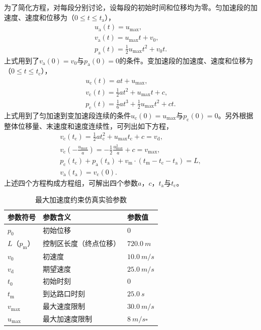 为了简化方程，对每段分别讨论，设每段的初始时间和位移均为零。匀加速段的加速度、速度和位移为（$0\leq t\leq t_\mathrm{a}$），
\begin{gather}
u_\mathrm{a}(t)=u_{\max},\label{eq:amax:ea1}\\
v_\mathrm{a}(t)=u_{\max}t+v_0,\\
p_\mathrm{a}(t)=\frac12u_{\max}t^2+v_0t.\label{eq:amax:ea3}
\end{gather}
上式用到了$v_\mathrm{a}(0)=v_0$与$p_\mathrm{a}(0)=0$的条件。变加速段的加速度、速度和位移为（$0\leq t\leq t_\mathrm{c}$），
\begin{gather}
u_\mathrm{c}(t)=at+u_{\max},\label{eq:amax:ca1}\\
v_\mathrm{c}(t)=\frac12at^2+u_{\max}t+c,\\
p_\mathrm{c}(t)=\frac16at^3+\frac12u_{\max}t^2+ct.\label{eq:amax:ca3}
\end{gather}
上式用到了匀加速到变加速段连续的条件$u_\mathrm{c}(0)=u_{\max}$与$p_\mathrm{c}(0)=0$。另外根据整体位移量、末速度和速度连续性，可列出如下方程，
\begin{gather}
v_\mathrm{c}(t_\mathrm{c})=\frac12at_\mathrm{c}^2+u_{\max}t_\mathrm{c}+c=v_\mathrm{d},\label{eq:amax:1}\\
v_\mathrm{c}(-\frac{u_{\max}}{a})=-\frac12\frac{u_{\max}^2}{a}+c=v_\mathrm{max},\\
p_\mathrm{c}(t_\mathrm{c})+p_\mathrm{a}(t_\mathrm{a})+v_\mathrm{m}\cdot(t_\mathrm{m}-t_\mathrm{c}-t_\mathrm{a})=L,\\
v_\mathrm{a}(t_\mathrm{a})=v_\mathrm{c}(0).\label{eq:amax:4}
\end{gather}
上述四个方程构成方程组，可解出四个参数$a$，$c$，$t_\mathrm{a}$与$t_\mathrm{c}$。

\begin{table}[htbp]
\centering
\caption{最大加速度约束仿真实验参数}
\label{tab:amax:param}
\begin{tabular}{lll}
\toprule[1.5pt]
参数符号 & 参数含义 & 参数值 \\
\midrule[1pt]
$p_0$ & 初始位移 & $0$ \\
$L$（$p_\mathrm{m}$） & 控制区长度（终点位移） & $\SI{720.0}{m}$ \\
$v_0$ & 初速度 & $\SI{10.0}{m\per s}$ \\
$v_\mathrm{d}$ & 期望速度 & $\SI{25.0}{m\per s}$ \\
$t_0$ & 初始时刻 & $0$ \\
$t_\mathrm{m}$ & 到达路口时刻 & $\SI{25.0}{s}$ \\
$v_{\max}$ & 最大速度限制 & $\SI{30.0}{m\per s}$ \\
$u_{\max}$ & 最大加速度限制 & $\SI{8}{m\per s\square}$ \\
\bottomrule[1.5pt]
\end{tabular}
\end{table}

